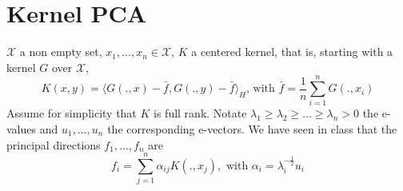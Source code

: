 \documentclass{article}[12pt]
\begin{document}
\section{Kernel PCA}
$\mathcal{X}$ a non empty set, $x_1,\ldots,x_n \in \mathcal{X}$, $K$ a centered kernel, that is, starting with a kernel $G$ over $\mathcal{X}$, 
  \begin{equation}
K(x,y)=\langle G(.,x)- \bar{f}, G(.,y)-\bar{f}\rangle_H \mbox{, with } \bar{f}=\frac{1}{n}\sum_{i=1}^n G(.,x_i)
\end{equation}
Assume for simplicity that $K$ is full rank. Notate $\lambda_1 \geq \lambda_2 \geq \ldots \geq \lambda_n>0$ the e-values and $u_1,\ldots,u_n$ the corresponding e-vectors. 
We have seen in class that the principal directions $f_1,\ldots,f_n$ are 
\begin{equation}
f_i=\sum_{j=1}^n \alpha_{ij} K(.,x_j), \mbox{ with } \alpha_i = \lambda_i^{-\frac{1}{2}}u_i
\end{equation}
\end{document}
